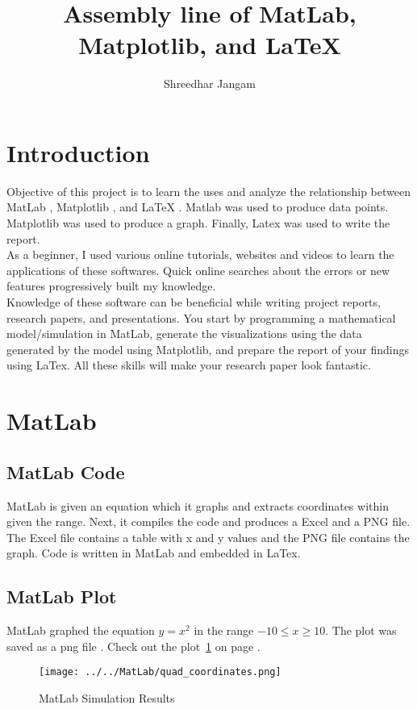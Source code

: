 \documentclass{article}
\begin{document}
\title{Assembly line of MatLab, Matplotlib, and \LaTeX{}}
\author{Shreedhar Jangam}

\maketitle

\section{Introduction}
	Objective of this project is to learn the uses and analyze the relationship between MatLab \cite{matlabtool}, Matplotlib \cite{matplotlibtool}, and LaTeX \cite{latextool}. Matlab was used to produce data points. Matplotlib was used to produce a graph. Finally, Latex was used to write the report.\\
	
	As a beginner, I used various online tutorials, websites and videos to learn the applications of these softwares. Quick online searches about the errors or new features progressively built my knowledge.\\
	
	Knowledge of these software can be beneficial while writing project reports, research papers, and presentations. You start by programming a mathematical model/simulation in MatLab, generate the visualizations using the data generated by the model using Matplotlib, and prepare the report of  your findings using LaTex. All these skills will make your research paper look fantastic.

\section{MatLab}
\subsection{MatLab Code}
MatLab is given an equation which it graphs and extracts coordinates within given the range. Next, it compiles the code and produces a Excel and a PNG file. The Excel file contains a table with x and y values and the PNG file contains the graph. Code is written in MatLab and embedded in LaTex\cite{matlabvid}. 



\subsection{MatLab Plot}
MatLab graphed the equation \(y = x^2\) in the range $-10 \leq x \geq 10$. The plot was saved as a png file \cite{matlabcode}. Check out the plot~\ref{fig:matlabfigure} on page \pageref{fig:matlabfigure}. 
\begin{figure}[h]
    \centering
   \texttt{[image: ../../MatLab/quad\_coordinates.png]} 
    \caption{MatLab Simulation Results}
    \label{fig:matlabfigure}
\end{figure}
\end{document}
